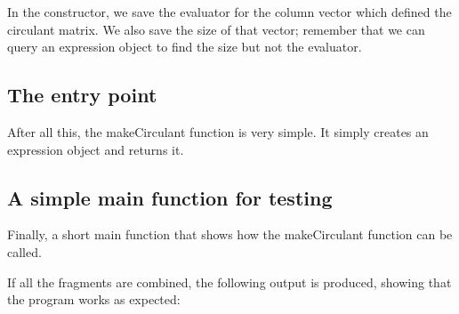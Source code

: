 In the constructor, we save the evaluator for the column vector which defined the circulant matrix. We also save the size of that vector; remember that we can query an expression object to find the size but not the evaluator.


\begin{DoxyCodeInclude}
\end{DoxyCodeInclude}
\hypertarget{_topic_new_expression_type_TopicEntry}{}\subsection{The entry point}\label{_topic_new_expression_type_TopicEntry}
After all this, the {\ttfamily make\+Circulant} function is very simple. It simply creates an expression object and returns it.


\begin{DoxyCodeInclude}
\end{DoxyCodeInclude}
\hypertarget{_topic_new_expression_type_TopicMain}{}\subsection{A simple main function for testing}\label{_topic_new_expression_type_TopicMain}
Finally, a short {\ttfamily main} function that shows how the {\ttfamily make\+Circulant} function can be called.


\begin{DoxyCodeInclude}
\end{DoxyCodeInclude}


If all the fragments are combined, the following output is produced, showing that the program works as expected\+:


\begin{DoxyCodeInclude}
\end{DoxyCodeInclude}
 